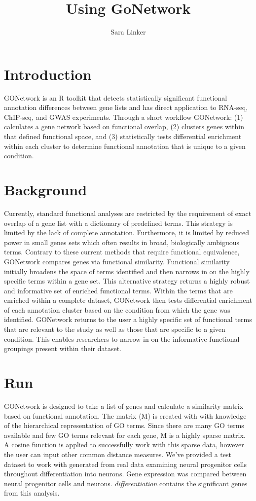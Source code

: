 \documentclass{article}
\title{Using GoNetwork}
\author{Sara Linker}
\begin{document}
\maketitle


\section*{Introduction}
GONetwork is an R toolkit that detects statistically significant functional annotation differences between gene lists and has direct application to RNA-seq, ChIP-seq, and GWAS experiments. Through a short workflow GONetwork: (1) calculates a gene network based on functional overlap, (2) clusters genes within that defined functional space, and (3) statistically tests differential enrichment within each cluster to determine functional annotation that is unique to a given condition.


 \section*{Background}
Currently, standard functional analyses are restricted by the requirement of exact overlap of a gene list with a dictionary of predefined terms. This strategy is limited by the lack of complete annotation. Furthermore, it is limited by reduced power in small genes sets which often results in broad, biologically ambiguous terms. Contrary to these current methods that require functional equivalence, GONetwork compares genes via functional similarity. Functional similarity initially broadens the space of terms identified and then narrows in on the highly specific terms within a gene set. This alternative strategy returns a highly robust and informative set of enriched functional terms. Within the terms that are enriched within a complete dataset, GONetwork then tests differential enrichment of each annotation cluster based on the condition from which the gene was identified. GONetwork returns to the user a highly specific set of functional terms that are relevant to the study as well as those that are specific to a given condition. This enables researchers to narrow in on the informative functional groupings present within their dataset.



\section*{Run}
GONetwork is designed to take a list of genes and calculate a similarity matrix based on functional annotation. The matrix (M) is created with with knowledge of the hierarchical representation of GO terms. Since there are many GO terms available and few GO terms relevant for each gene, M is a highly sparse matrix. A cosine function is applied to successfully work with this sparse data, however the user can input other common distance measures. We've provided a test dataset to work with generated from real data examining neural progenitor cells throughout differentiation into neurons. Gene expression was compared between neural progenitor cells and neurons. \textsl{differentiation} contains the significant genes from this analysis.
\end{document}
